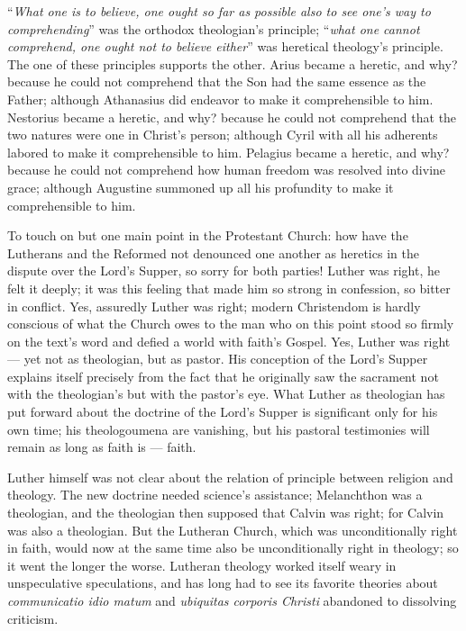 \documentclass[12pt,a4paper]{book}
\begin{document}
``\emph{What one is to believe, one ought so far as possible also to see one's way to
comprehending}'' was the orthodox theologian's principle; ``\emph{what one cannot comprehend,
one ought not to believe either}'' was heretical theology's principle. The one of these
principles supports the other. Arius became a heretic, and why? because he could not comprehend
that the Son had the same
essence as the Father; although Athanasius did endeavor to make it comprehensible to him.
Nestorius became a heretic, and why? because he could not comprehend that the two natures were
one in Christ's person; although Cyril with all his adherents labored to make it comprehensible
to him. Pelagius became a heretic, and why? because he could not comprehend how human freedom
was resolved into divine grace; although Augustine summoned up all his profundity to make it
comprehensible to him.

To touch on but one main point in the Protestant Church: how have the Lutherans and the Reformed
not denounced one another as heretics in the dispute over the Lord's Supper, so sorry for both
parties! Luther was right, he felt it deeply; it was this feeling that made him so strong in
confession, so bitter in conflict. Yes, assuredly Luther was right; modern Christendom is hardly
conscious of what the Church owes to the man who on this point stood so firmly on the text's word
and defied a world with faith's Gospel. Yes, Luther was right --- yet not as theologian, but as
pastor. His conception of the Lord's Supper explains itself precisely from the fact that he
originally saw the sacrament not with the theologian's but with the pastor's eye. What Luther as
theologian has put forward about the doctrine of the Lord's Supper is significant only for his
own time; his theologoumena are vanishing, but his pastoral testimonies will remain as long as
faith is --- faith.

Luther himself was not clear about the relation of principle between religion and theology. The
new doctrine needed science's assistance; Melanchthon was a theologian, and the theologian then
supposed that Calvin was right; for Calvin was also a theologian. But the Lutheran Church, which
was unconditionally right in faith, would now at the same time also be unconditionally right in
theology; so it went the longer the worse. Lutheran theology worked itself weary in unspeculative
speculations, and has long had to see its favorite theories about \textit{communicatio
idio%
matum} and \textit{ubiquitas corporis Christi} abandoned to dissolving criticism.
\end{document}
